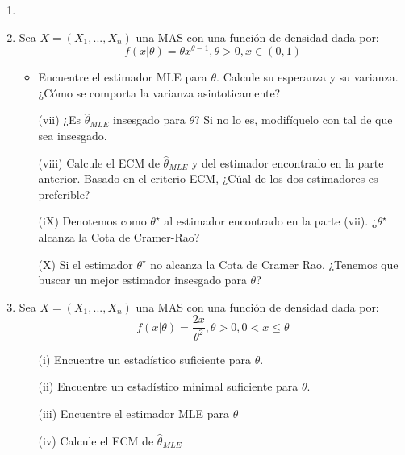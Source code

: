 \begin{enumerate}
\item \item Sea $X=(X_1,...,X_n)$ una MAS con una función de densidad dada por:
    \begin{equation}
        \nonumber 
        f(x|\theta)=\theta x^{\theta -1},\theta>0,x\in (0,1)
    \end{equation}
    \begin{itemize}
        \item Encuentre el estimador MLE para $\theta$. Calcule su esperanza y su varianza. ¿Cómo se comporta la varianza asintoticamente?
    
    \item[(vii)] ¿Es $\hat{\theta}_{MLE}$ insesgado para $\theta$? Si no lo es, modifíquelo con tal de que sea insesgado.
    
    \item[(viii)] Calcule el ECM de $\hat{\theta}_{MLE}$ y del estimador encontrado en la parte anterior. Basado en el criterio ECM, ¿Cúal de los dos estimadores es preferible?
    
    \item[(iX)] Denotemos como $\theta^{\star}$ al estimador encontrado en la parte (vii). ¿$\theta^{\star}$ alcanza la Cota de Cramer-Rao?
    
    \item[(X)] Si el estimador $\theta^{\star}$ no alcanza la Cota de Cramer Rao, ¿Tenemos que buscar un mejor estimador insesgado para $\theta$?
    \end{itemize}
    
    \item Sea $X=(X_1,...,X_n)$ una MAS con una función de densidad dada por:
\begin{equation}
    \nonumber 
    f(x|\theta)=\frac{2x}{\theta^2},\theta>0,0<x\leq \theta
\end{equation}

\begin{itemize}
    \item[(i)] Encuentre un estadístico suficiente para $\theta$.
    
    \item[(ii)] Encuentre un estadístico minimal suficiente para $\theta$.
    
    \item[(iii)] Encuentre el estimador MLE para $\theta$
    
    \item[(iv)] Calcule el ECM de $\hat{\theta}_{MLE}$
    

\end{itemize}
\end{enumerate}
